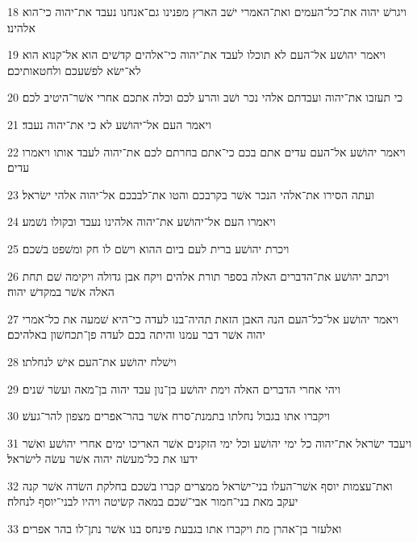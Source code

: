 \par 18 ויגרשׁ יהוה את־כל־העמים ואת־האמרי ישׁב הארץ מפנינו גם־אנחנו נעבד את־יהוה כי־הוא אלהינו׃
\par 19 ויאמר יהושׁע אל־העם לא תוכלו לעבד את־יהוה כי־אלהים קדשׁים הוא אל־קנוא הוא לא־ישׂא לפשׁעכם ולחטאותיכם׃
\par 20 כי תעזבו את־יהוה ועבדתם אלהי נכר ושׁב והרע לכם וכלה אתכם אחרי אשׁר־היטיב לכם׃
\par 21 ויאמר העם אל־יהושׁע לא כי את־יהוה נעבד׃
\par 22 ויאמר יהושׁע אל־העם עדים אתם בכם כי־אתם בחרתם לכם את־יהוה לעבד אותו ויאמרו עדים׃
\par 23 ועתה הסירו את־אלהי הנכר אשׁר בקרבכם והטו את־לבבכם אל־יהוה אלהי ישׂראל׃
\par 24 ויאמרו העם אל־יהושׁע את־יהוה אלהינו נעבד ובקולו נשׁמע׃
\par 25 ויכרת יהושׁע ברית לעם ביום ההוא וישׂם לו חק ומשׁפט בשׁכם׃
\par 26 ויכתב יהושׁע את־הדברים האלה בספר תורת אלהים ויקח אבן גדולה ויקימה שׁם תחת האלה אשׁר במקדשׁ יהוה׃
\par 27 ויאמר יהושׁע אל־כל־העם הנה האבן הזאת תהיה־בנו לעדה כי־היא שׁמעה את כל־אמרי יהוה אשׁר דבר עמנו והיתה בכם לעדה פן־תכחשׁון באלהיכם׃
\par 28 וישׁלח יהושׁע את־העם אישׁ לנחלתו׃
\par 29 ויהי אחרי הדברים האלה וימת יהושׁע בן־נון עבד יהוה בן־מאה ועשׂר שׁנים׃
\par 30 ויקברו אתו בגבול נחלתו בתמנת־סרח אשׁר בהר־אפרים מצפון להר־געשׁ׃
\par 31 ויעבד ישׂראל את־יהוה כל ימי יהושׁע וכל ימי הזקנים אשׁר האריכו ימים אחרי יהושׁע ואשׁר ידעו את כל־מעשׂה יהוה אשׁר עשׂה לישׂראל׃
\par 32 ואת־עצמות יוסף אשׁר־העלו בני־ישׂראל ממצרים קברו בשׁכם בחלקת השׂדה אשׁר קנה יעקב מאת בני־חמור אבי־שׁכם במאה קשׂיטה ויהיו לבני־יוסף לנחלה׃
\par 33 ואלעזר בן־אהרן מת ויקברו אתו בגבעת פינחס בנו אשׁר נתן־לו בהר אפרים׃


